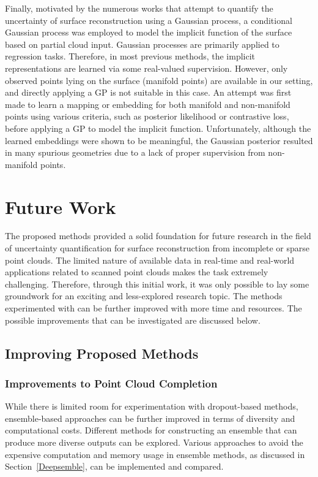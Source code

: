 Finally, motivated by the numerous works that attempt to quantify the uncertainty of surface reconstruction using a Gaussian process, a conditional Gaussian process was employed to model the implicit function of the surface based on partial cloud input. Gaussian processes are primarily applied to regression tasks. Therefore, in most previous methods, the implicit representations are learned via some real-valued supervision. However, only observed points lying on the surface (manifold points) are available in our setting, and directly applying a GP is not suitable in this case. An attempt was first made to learn a mapping or embedding for both manifold and non-manifold points using various criteria, such as posterior likelihood or contrastive loss, before applying a GP to model the implicit function. Unfortunately, although the learned embeddings were shown to be meaningful, the Gaussian posterior resulted in many spurious geometries due to a lack of proper supervision from non-manifold points.



\section{Future Work}
The proposed methods provided a solid foundation for future research in the field of uncertainty quantification for surface reconstruction from incomplete or sparse point clouds. The limited nature of available data in real-time and real-world applications related to scanned point clouds makes the task extremely challenging. Therefore, through this initial work, it was only possible to lay some groundwork for an exciting and less-explored research topic. The methods experimented with can be further improved with more time and resources. The possible improvements that can be investigated are discussed below.

    \subsection{Improving Proposed Methods}
        \subsubsection{Improvements to Point Cloud Completion}
        While there is limited room for experimentation with dropout-based methods, ensemble-based approaches can be further improved in terms of diversity and computational costs. Different methods for constructing an ensemble that can produce more diverse outputs can be explored. Various approaches to avoid the expensive computation and memory usage in ensemble methods, as discussed in Section~\ref{Deepsemble}, can be implemented and compared.
        \newline
        
